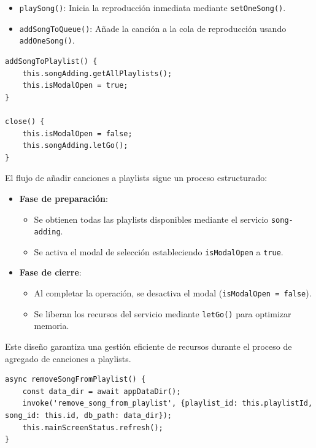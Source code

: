 \documentclass[11pt, a4paper]{article}
\begin{document}
                \begin{itemize}
                    \item \texttt{playSong()}: Inicia la reproducción inmediata mediante \texttt{setOneSong()}.
                    \item \texttt{addSongToQueue()}: Añade la canción a la cola de reproducción usando \texttt{addOneSong()}.
                \end{itemize}

                \begin{lstlisting}[caption={addSongToPlaylist()}]
addSongToPlaylist() {
    this.songAdding.getAllPlaylists();
    this.isModalOpen = true;
}

close() {
    this.isModalOpen = false;
    this.songAdding.letGo();
}
                \end{lstlisting}

                El flujo de añadir canciones a playlists sigue un proceso estructurado:

                \begin{itemize}
                    \item \textbf{Fase de preparación}:
                    \begin{itemize}
                        \item Se obtienen todas las playlists disponibles mediante el servicio \texttt{song-adding}.
                        \item Se activa el modal de selección estableciendo \texttt{isModalOpen} a \texttt{true}.
                    \end{itemize}
                    
                    \item \textbf{Fase de cierre}:
                    \begin{itemize}
                        \item Al completar la operación, se desactiva el modal (\texttt{isModalOpen = false}).
                        \item Se liberan los recursos del servicio mediante \texttt{letGo()} para optimizar memoria.
                    \end{itemize}
                \end{itemize}

                Este diseño garantiza una gestión eficiente de recursos durante el proceso de agregado de canciones a playlists.

                \begin{lstlisting}[caption={removeSongFromPlaylist()}]
async removeSongFromPlaylist() {
    const data_dir = await appDataDir();
    invoke('remove_song_from_playlist', {playlist_id: this.playlistId, song_id: this.id, db_path: data_dir});
    this.mainScreenStatus.refresh();
}
                \end{lstlisting}
\end{document}
